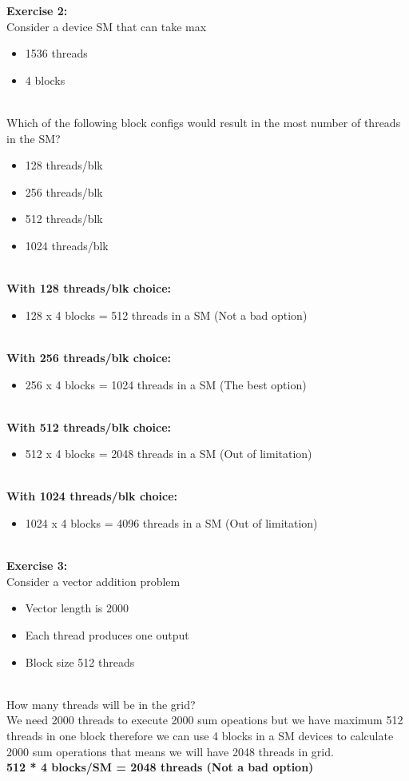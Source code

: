 \documentclass{article}
\begin{document}
\textbf{Exercise 2:}
\\
Consider a device SM that can take max
\\
\begin{itemize}
\item 1536 threads
\item 4 blocks
\end{itemize}
\\
Which of the following block configs would result in the most
number of threads in the SM?
\\
\begin{itemize}
\item 128 threads/blk
\item 256 threads/blk
\item 512 threads/blk
\item 1024 threads/blk
\end{itemize}
\\
\textbf{With 128 threads/blk choice: }
\begin{itemize}
\item 128 x 4 blocks = 512 threads in a SM (Not a bad option)
\end{itemize}
\\
\textbf{With 256 threads/blk choice: }
\begin{itemize}
\item 256 x 4 blocks = 1024 threads in a SM (The best option)
\end{itemize}
\\
\textbf{With 512 threads/blk choice: }
\begin{itemize}
\item 512 x 4 blocks = 2048 threads in a SM (Out of limitation)
\end{itemize}
\\
\textbf{With 1024 threads/blk choice: }
\begin{itemize}
\item 1024 x 4 blocks = 4096 threads in a SM (Out of limitation)
\end{itemize}
\\
\textbf{Exercise 3:}
\\
Consider a vector addition problem
\begin{itemize}
\item Vector length is 2000
\item Each thread produces one output
\item Block size 512 threads
\end{itemize}
\\
How many threads will be in the grid?
\\
We need 2000 threads to execute 2000 sum opeations but we have 
maximum 512 threads in one block therefore we can use 4 blocks in 
a SM devices to calculate 2000 sum operations that means we will have
2048 threads in grid.
\\
\textbf{512 * 4 blocks/SM = 2048 threads (Not a bad option)}
\end{document}
